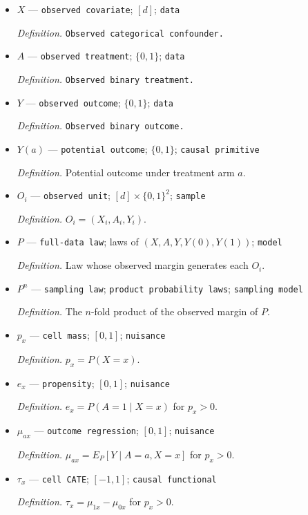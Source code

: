 \documentclass{article}
\begin{document}
\begin{itemize}
  \item \(X\) --- \texttt{observed covariate}; \([d]\); \texttt{data}
  \par\smallskip\noindent\emph{Definition.} \texttt{Observed categorical confounder.}
  \item \(A\) --- \texttt{observed treatment}; \(\{0,1\}\); \texttt{data}
  \par\smallskip\noindent\emph{Definition.} \texttt{Observed binary treatment.}
  \item \(Y\) --- \texttt{observed outcome}; \(\{0,1\}\); \texttt{data}
  \par\smallskip\noindent\emph{Definition.} \texttt{Observed binary outcome.}
  \item \(Y(a)\) --- \texttt{potential outcome}; \(\{0,1\}\); \texttt{causal primitive}
  \par\smallskip\noindent\emph{Definition.} Potential outcome under treatment arm \(a\).
  \item \(O_i\) --- \texttt{observed unit}; \([d]\times\{0,1\}^2\); \texttt{sample}
  \par\smallskip\noindent\emph{Definition.} \(O_i=(X_i,A_i,Y_i)\).
  \item \(P\) --- \texttt{full-\allowbreak{}data law}; laws of \((X,A,Y,Y(0),Y(1))\); \texttt{model}
  \par\smallskip\noindent\emph{Definition.} Law whose observed margin generates each \(O_i\).
  \item \(P^n\) --- \texttt{sampling law}; \texttt{product probability laws}; \texttt{sampling model}
  \par\smallskip\noindent\emph{Definition.} The \(n\)-fold product of the observed margin of \(P\).
  \item \(p_x\) --- \texttt{cell mass}; \([0,1]\); \texttt{nuisance}
  \par\smallskip\noindent\emph{Definition.} \(p_x=P(X=x)\).
  \item \(e_x\) --- \texttt{propensity}; \([0,1]\); \texttt{nuisance}
  \par\smallskip\noindent\emph{Definition.} \(e_x=P(A=1\mid X=x)\) for \(p_x>0\).
  \item \(\mu_{ax}\) --- \texttt{outcome regression}; \([0,1]\); \texttt{nuisance}
  \par\smallskip\noindent\emph{Definition.} \(\mu_{ax}=E_P[Y\mid A=a,X=x]\) for \(p_x>0\).
  \item \(\tau_x\) --- \texttt{cell CATE}; \([-1,1]\); \texttt{causal functional}
  \par\smallskip\noindent\emph{Definition.} \(\tau_x=\mu_{1x}-\mu_{0x}\) for \(p_x>0\).

\end{itemize}
\end{document}
